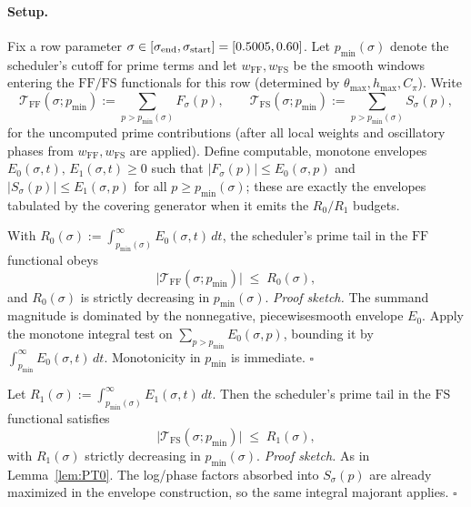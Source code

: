 \documentclass[11pt]{article}
\theoremstyle{definition}
\theoremstyle{remark}
\begin{document}
\paragraph{Setup.}
Fix a row parameter $\sigma\in[\sigma_{\rm end},\sigma_{\rm start}]=[0.5005,0.60]$.
Let $p_{\min}(\sigma)$ denote the scheduler's cutoff for prime terms and
let $w_{\mathrm{FF}},w_{\mathrm{FS}}$ be the smooth windows entering the
$\mathrm{FF}/\mathrm{FS}$ functionals for this row (determined by
$\theta_{\max},h_{\max},C_{\pi}$).
Write
\[
\mathcal T_{\mathrm{FF}}(\sigma;p_{\min})
  :=\sum_{p>p_{\min}(\sigma)} F_{\sigma}(p),
\qquad
\mathcal T_{\mathrm{FS}}(\sigma;p_{\min})
  :=\sum_{p>p_{\min}(\sigma)} S_{\sigma}(p),
\]
for the uncomputed prime contributions (after all local weights and
oscillatory phases from $w_{\mathrm{FF}},w_{\mathrm{FS}}$ are applied).
Define computable, monotone envelopes $E_0(\sigma,t),\,E_1(\sigma,t)\ge0$
such that $|F_{\sigma}(p)|\le E_0(\sigma,p)$ and $|S_{\sigma}(p)|\le E_1(\sigma,p)$
for all $p\ge p_{\min}(\sigma)$; these are exactly the envelopes tabulated
by the covering generator when it emits the $R_0/R_1$ budgets.

\begin{ptlemma}\label{lem:PT0}
With $R_{0}(\sigma):=\int_{p_{\min}(\sigma)}^{\infty}E_0(\sigma,t)\,dt$,
the scheduler's prime tail in the $\mathrm{FF}$ functional obeys
\[
\bigl|\mathcal T_{\mathrm{FF}}(\sigma;p_{\min})\bigr|
  \;\le\; R_{0}(\sigma),
\]
and $R_{0}(\sigma)$ is strictly decreasing in $p_{\min}(\sigma)$.
\emph{Proof sketch.} The summand magnitude is dominated by the non\textendash negative,
piecewise\textendash smooth envelope $E_0$. Apply the monotone integral test on
$\sum_{p>p_{\min}}E_0(\sigma,p)$, bounding it by $\int_{p_{\min}}^{\infty}E_0(\sigma,t)\,dt$.
Monotonicity in $p_{\min}$ is immediate. $\square$
\end{ptlemma}

\begin{ptlemma}\label{lem:PT1}
Let $R_{1}(\sigma):=\int_{p_{\min}(\sigma)}^{\infty}E_1(\sigma,t)\,dt$.
Then the scheduler's prime tail in the $\mathrm{FS}$ functional satisfies
\[
\bigl|\mathcal T_{\mathrm{FS}}(\sigma;p_{\min})\bigr|
  \;\le\; R_{1}(\sigma),
\]
with $R_{1}(\sigma)$ strictly decreasing in $p_{\min}(\sigma)$.
\emph{Proof sketch.} As in Lemma~\ref{lem:PT0}. The log/phase factors
absorbed into $S_{\sigma}(p)$ are already maximized in the envelope
construction, so the same integral majorant applies. $\square$
\end{ptlemma}
\end{document}
